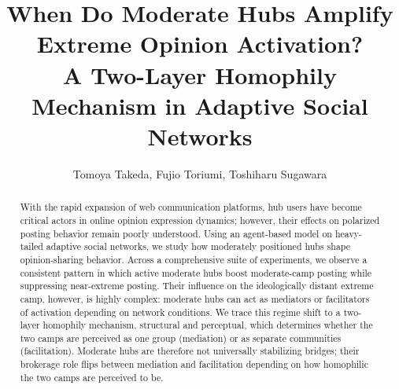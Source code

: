 \documentclass{svproc}
\def\Blue{\color[rgb]{0,0,1}}
\def\Black{\color[rgb]{0,0,0}}
\begin{document}
\mainmatter

\title{When Do Moderate Hubs Amplify Extreme Opinion Activation? \\ A Two-Layer Homophily Mechanism in Adaptive Social Networks}

\author{Tomoya Takeda, Fujio Toriumi, Toshiharu Sugawara}


\maketitle

\begin{abstract}\Blue
With the rapid expansion of web communication platforms, hub users
have become critical actors in online opinion expression dynamics;
however, their effects on polarized posting behavior remain poorly
understood. Using an agent-based model on heavy-tailed adaptive social
networks, we study how moderately positioned hubs shape
opinion-sharing behavior. Across a comprehensive suite of experiments,
we observe a consistent pattern in which active moderate hubs boost
moderate-camp posting while suppressing near-extreme posting. Their
influence on the ideologically distant extreme camp, however, is
highly complex: moderate hubs can act as mediators or facilitators of
activation depending on network conditions. We trace this regime shift
to a two-layer homophily mechanism, structural and perceptual, which
determines whether the two camps are perceived as one group
(mediation) or as separate communities (facilitation). Moderate hubs
are therefore not universally stabilizing bridges; their brokerage
role flips between mediation and facilitation depending on how
homophilic the two camps are perceived to be.
\Black
{} 
\end{abstract}
\end{document}
